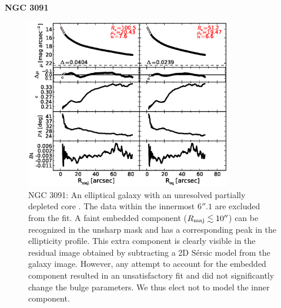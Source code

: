 \documentclass[preprint2]{emulateapj}
\newcommand{\fitfigurewidth}{0.8\textwidth}
\begin{document}
  \clearpage\newpage\noindent
  {\bf NGC 3091 \\}

  \begin{figure}[h]
  \begin{center}
  \includegraphics[width=\fitfigurewidth]{images/n3091_1Dfit.eps}
  \caption{NGC 3091: 
  An elliptical galaxy with an unresolved partially depleted core \citep{rusli2013}. %
  The data within the innermost $6''.1$ are excluded from the fit.
  A faint embedded component ($R_{\rm maj} \lesssim 10''$) can be recognized in the unsharp mask and has a corresponding peak in the
  ellipticity profile.
  This extra component is clearly visible in the residual image obtained by subtracting a 2D S\'ersic model from the  
  galaxy image.
  However, any attempt to account for the embedded component resulted in an unsatisfactory fit and did not 
  significantly change the bulge parameters.
  We thus elect not to model the inner component. 
  }
  \end{center}
  \end{figure}
\end{document}
